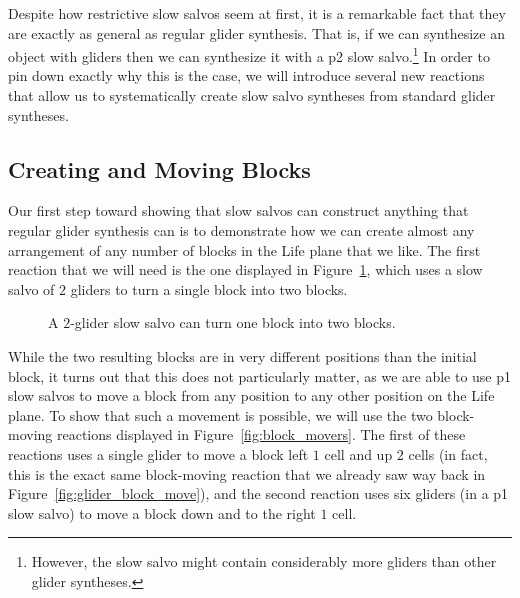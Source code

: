 Despite how restrictive slow salvos seem at first, it is a remarkable fact that they are exactly as general as regular glider synthesis. That is, if we can synthesize an object with gliders then we can synthesize it with a p2 slow salvo.\footnote{However, the slow salvo might contain considerably more gliders than other glider syntheses.} In order to pin down exactly why this is the case, we will introduce several new reactions that allow us to systematically create slow salvo syntheses from standard glider syntheses.


\subsection{Creating and Moving Blocks}\label{sec:slow_salvo_blocks}

Our first step toward showing that slow salvos can construct anything that regular glider synthesis can is to demonstrate how we can create almost any arrangement of any number of blocks in the Life plane that we like. The first reaction that we will need is the one displayed in Figure~\ref{fig:slow_salvo_splitter}, which uses a slow salvo of $2$ gliders to turn a single block into two blocks.

\begin{figure}[!ht]
	\centering{}
	\caption{A $2$-glider slow salvo can turn one block into two blocks.}\label{fig:slow_salvo_splitter}
\end{figure}

While the two resulting blocks are in very different positions than the initial block, it turns out that this does not particularly matter, as we are able to use p1 slow salvos to move a block from any position to any other position on the Life plane. To show that such a movement is possible, we will use the two block-moving reactions displayed in Figure~\ref{fig:block_movers}. The first of these reactions uses a single glider to move a block left $1$ cell and up $2$ cells (in fact, this is the exact same block-moving reaction that we already saw way back in Figure~\ref{fig:glider_block_move}), and the second reaction uses six gliders (in a p1 slow salvo) to move a block down and to the right $1$ cell.

